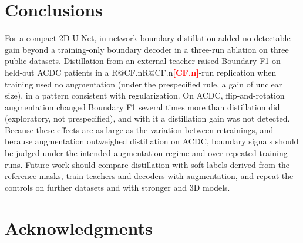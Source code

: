 \documentclass[fleqn,10pt,lineno]{wlpeerj}
\makeatletter
\newcommand{\R}[1]{\ifcsname R@#1\endcsname\csname R@#1\endcsname\else\textbf{\textcolor{red}{[#1]}}\fi}
\makeatother
\begin{document}
\section*{Conclusions}
For a compact 2D U-Net, in-network boundary distillation added no detectable gain beyond a training-only boundary decoder in a three-run ablation on three public datasets. Distillation from an external teacher raised Boundary F1 on held-out ACDC patients in a \R{CF.n}-run replication when training used no augmentation (under the prespecified rule, a gain of unclear size), in a pattern consistent with regularization. On ACDC, flip-and-rotation augmentation changed Boundary F1 several times more than distillation did (exploratory, not prespecified), and with it a distillation gain was not detected. Because these effects are as large as the variation between retrainings, and because augmentation outweighed distillation on ACDC, boundary signals should be judged under the intended augmentation regime and over repeated training runs. Future work should compare distillation with soft labels derived from the reference masks, train teachers and decoders with augmentation, and repeat the controls on further datasets and with stronger and 3D models.

\section*{Acknowledgments}



\end{document}
